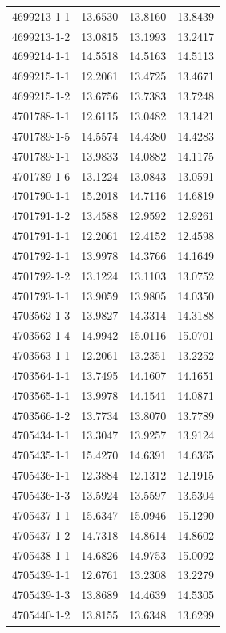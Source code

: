 \begin{longtable}{lrrr}
4699213-1-1 & 13.6530 & 13.8160 & 13.8439 \\
4699213-1-2 & 13.0815 & 13.1993 & 13.2417 \\
4699214-1-1 & 14.5518 & 14.5163 & 14.5113 \\
4699215-1-1 & 12.2061 & 13.4725 & 13.4671 \\
4699215-1-2 & 13.6756 & 13.7383 & 13.7248 \\
4701788-1-1 & 12.6115 & 13.0482 & 13.1421 \\
4701789-1-5 & 14.5574 & 14.4380 & 14.4283 \\
4701789-1-1 & 13.9833 & 14.0882 & 14.1175 \\
4701789-1-6 & 13.1224 & 13.0843 & 13.0591 \\
4701790-1-1 & 15.2018 & 14.7116 & 14.6819 \\
4701791-1-2 & 13.4588 & 12.9592 & 12.9261 \\
4701791-1-1 & 12.2061 & 12.4152 & 12.4598 \\
4701792-1-1 & 13.9978 & 14.3766 & 14.1649 \\
4701792-1-2 & 13.1224 & 13.1103 & 13.0752 \\
4701793-1-1 & 13.9059 & 13.9805 & 14.0350 \\
4703562-1-3 & 13.9827 & 14.3314 & 14.3188 \\
4703562-1-4 & 14.9942 & 15.0116 & 15.0701 \\
4703563-1-1 & 12.2061 & 13.2351 & 13.2252 \\
4703564-1-1 & 13.7495 & 14.1607 & 14.1651 \\
4703565-1-1 & 13.9978 & 14.1541 & 14.0871 \\
4703566-1-2 & 13.7734 & 13.8070 & 13.7789 \\
4705434-1-1 & 13.3047 & 13.9257 & 13.9124 \\
4705435-1-1 & 15.4270 & 14.6391 & 14.6365 \\
4705436-1-1 & 12.3884 & 12.1312 & 12.1915 \\
4705436-1-3 & 13.5924 & 13.5597 & 13.5304 \\
4705437-1-1 & 15.6347 & 15.0946 & 15.1290 \\
4705437-1-2 & 14.7318 & 14.8614 & 14.8602 \\
4705438-1-1 & 14.6826 & 14.9753 & 15.0092 \\
4705439-1-1 & 12.6761 & 13.2308 & 13.2279 \\
4705439-1-3 & 13.8689 & 14.4639 & 14.5305 \\
4705440-1-2 & 13.8155 & 13.6348 & 13.6299 \\

\end{longtable}
